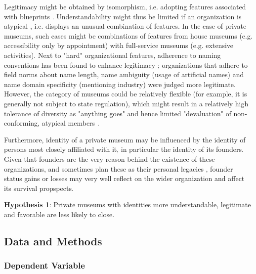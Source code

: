 \documentclass[12pt]{article}
\begin{document}
Legitimacy might be obtained by isomorphism, i.e. adopting features associated with blueprints \parencite{diMaggio_1983_iron}.
Understandability \parencite{Glynn_Abzug_2002_names} might thus be limited if an organization is atypical \parencite{Rosch_1975_family}, i.e. displays an unusual combination of features.
In the case of private museums, such cases might be combinations of features from house museums (e.g. accessibility only by appointment) with full-service museums (e.g. extensive activities). 
Next to "hard" organizational features, adherence to naming conventions has been found to enhance legitimacy \parencite{Glynn_Abzug_2002_names}; organizations that adhere to field norms about name length, name ambiguity (usage of artificial names) and name domain specificity (mentioning industry) were judged more legitimate. 
However, the category of museums could be relatively flexible (for example, it is generally not subject to state regulation), which might result in a relatively high tolerance of diversity as "anything goes" and hence limited "devaluation" of non-conforming, atypical members \parencite{Bogaert_etal_2014_ecological}.


Furthermore, identity of a private museum may be influenced by the identity of persons most closely affiliated with it, in particular the identity of its founders.
Given that founders are the very reason behind the existence of these organizations, and sometimes plan these as their personal legacies \parencite{Walker_2019_collector}, founder status gains or losses may very well reflect on the wider organization and affect its survival propspects.


\bigbreak
\noindent
\textbf{Hypothesis 1}: Private museums with identities more understandable, legitimate and favorable are less likely to close. 





\subsection*{Data and Methods}


\subsubsection*{Dependent Variable}
\end{document}
